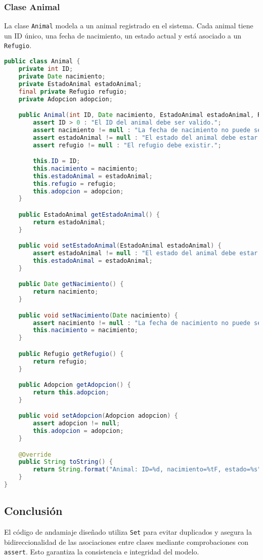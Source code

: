 \subsubsection{Clase Animal}
La clase \texttt{Animal} modela a un animal registrado en el sistema. Cada animal tiene un ID único, una fecha de nacimiento, un estado actual y está asociado a un \texttt{Refugio}.

\begin{lstlisting}[language=Java]
public class Animal {
    private int ID;
    private Date nacimiento;
    private EstadoAnimal estadoAnimal;
    final private Refugio refugio;
    private Adopcion adopcion;

    public Animal(int ID, Date nacimiento, EstadoAnimal estadoAnimal, Refugio refugio, Adopcion adopcion) {
        assert ID > 0 : "El ID del animal debe ser valido.";
        assert nacimiento != null : "La fecha de nacimiento no puede ser nula.";
        assert estadoAnimal != null : "El estado del animal debe estar definido.";
        assert refugio != null : "El refugio debe existir.";

        this.ID = ID;
        this.nacimiento = nacimiento;
        this.estadoAnimal = estadoAnimal;
        this.refugio = refugio;
        this.adopcion = adopcion;
    }

    public EstadoAnimal getEstadoAnimal() {
        return estadoAnimal;
    }

    public void setEstadoAnimal(EstadoAnimal estadoAnimal) {
        assert estadoAnimal != null : "El estado del animal debe estar definido.";
        this.estadoAnimal = estadoAnimal;
    }

    public Date getNacimiento() {
        return nacimiento;
    }

    public void setNacimiento(Date nacimiento) {
        assert nacimiento != null : "La fecha de nacimiento no puede ser nula";
        this.nacimiento = nacimiento;
    }

    public Refugio getRefugio() {
        return refugio;
    }

    public Adopcion getAdopcion() {
        return this.adopcion;
    }

    public void setAdopcion(Adopcion adopcion) {
        assert adopcion != null;
        this.adopcion = adopcion;
    }

    @Override
    public String toString() {
        return String.format("Animal: ID=%d, nacimiento=%tF, estado=%s", ID, nacimiento, estadoAnimal);
    }
}
\end{lstlisting}


\subsection{Conclusión}
El código de andamiaje diseñado utiliza \texttt{Set} para evitar duplicados y asegura la bidireccionalidad de las asociaciones entre clases mediante comprobaciones con \texttt{assert}. Esto garantiza la consistencia e integridad del modelo.
